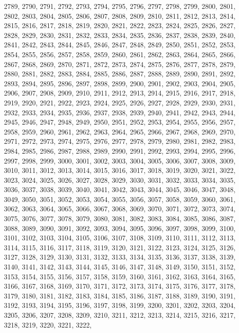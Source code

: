 2789,
2790,
2791,
2792,
2793,
2794,
2795,
2796,
2797,
2798,
2799,
2800,
2801,
2802,
2803,
2804,
2805,
2806,
2807,
2808,
2809,
2810,
2811,
2812,
2813,
2814,
2815,
2816,
2817,
2818,
2819,
2820,
2821,
2822,
2823,
2824,
2825,
2826,
2827,
2828,
2829,
2830,
2831,
2832,
2833,
2834,
2835,
2836,
2837,
2838,
2839,
2840,
2841,
2842,
2843,
2844,
2845,
2846,
2847,
2848,
2849,
2850,
2851,
2852,
2853,
2854,
2855,
2856,
2857,
2858,
2859,
2860,
2861,
2862,
2863,
2864,
2865,
2866,
2867,
2868,
2869,
2870,
2871,
2872,
2873,
2874,
2875,
2876,
2877,
2878,
2879,
2880,
2881,
2882,
2883,
2884,
2885,
2886,
2887,
2888,
2889,
2890,
2891,
2892,
2893,
2894,
2895,
2896,
2897,
2898,
2899,
2900,
2901,
2902,
2903,
2904,
2905,
2906,
2907,
2908,
2909,
2910,
2911,
2912,
2913,
2914,
2915,
2916,
2917,
2918,
2919,
2920,
2921,
2922,
2923,
2924,
2925,
2926,
2927,
2928,
2929,
2930,
2931,
2932,
2933,
2934,
2935,
2936,
2937,
2938,
2939,
2940,
2941,
2942,
2943,
2944,
2945,
2946,
2947,
2948,
2949,
2950,
2951,
2952,
2953,
2954,
2955,
2956,
2957,
2958,
2959,
2960,
2961,
2962,
2963,
2964,
2965,
2966,
2967,
2968,
2969,
2970,
2971,
2972,
2973,
2974,
2975,
2976,
2977,
2978,
2979,
2980,
2981,
2982,
2983,
2984,
2985,
2986,
2987,
2988,
2989,
2990,
2991,
2992,
2993,
2994,
2995,
2996,
2997,
2998,
2999,
3000,
3001,
3002,
3003,
3004,
3005,
3006,
3007,
3008,
3009,
3010,
3011,
3012,
3013,
3014,
3015,
3016,
3017,
3018,
3019,
3020,
3021,
3022,
3023,
3024,
3025,
3026,
3027,
3028,
3029,
3030,
3031,
3032,
3033,
3034,
3035,
3036,
3037,
3038,
3039,
3040,
3041,
3042,
3043,
3044,
3045,
3046,
3047,
3048,
3049,
3050,
3051,
3052,
3053,
3054,
3055,
3056,
3057,
3058,
3059,
3060,
3061,
3062,
3063,
3064,
3065,
3066,
3067,
3068,
3069,
3070,
3071,
3072,
3073,
3074,
3075,
3076,
3077,
3078,
3079,
3080,
3081,
3082,
3083,
3084,
3085,
3086,
3087,
3088,
3089,
3090,
3091,
3092,
3093,
3094,
3095,
3096,
3097,
3098,
3099,
3100,
3101,
3102,
3103,
3104,
3105,
3106,
3107,
3108,
3109,
3110,
3111,
3112,
3113,
3114,
3115,
3116,
3117,
3118,
3119,
3120,
3121,
3122,
3123,
3124,
3125,
3126,
3127,
3128,
3129,
3130,
3131,
3132,
3133,
3134,
3135,
3136,
3137,
3138,
3139,
3140,
3141,
3142,
3143,
3144,
3145,
3146,
3147,
3148,
3149,
3150,
3151,
3152,
3153,
3154,
3155,
3156,
3157,
3158,
3159,
3160,
3161,
3162,
3163,
3164,
3165,
3166,
3167,
3168,
3169,
3170,
3171,
3172,
3173,
3174,
3175,
3176,
3177,
3178,
3179,
3180,
3181,
3182,
3183,
3184,
3185,
3186,
3187,
3188,
3189,
3190,
3191,
3192,
3193,
3194,
3195,
3196,
3197,
3198,
3199,
3200,
3201,
3202,
3203,
3204,
3205,
3206,
3207,
3208,
3209,
3210,
3211,
3212,
3213,
3214,
3215,
3216,
3217,
3218,
3219,
3220,
3221,
3222,
